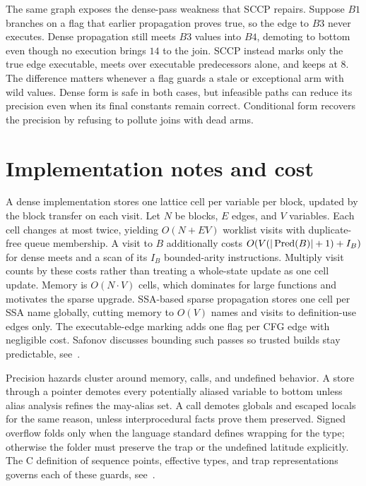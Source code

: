 The same graph exposes the dense-pass weakness that SCCP repairs.
Suppose $B1$ branches on a flag that earlier propagation proves true, so the edge to $B3$ never executes.
Dense propagation still meets $B3$ values into $B4$, demoting  to bottom even though no execution brings $14$ to the join.
SCCP instead marks only the true edge executable, meets over executable predecessors alone, and keeps  at $8$.
The difference matters whenever a flag guards a stale or exceptional arm with wild values.
Dense form is safe in both cases, but infeasible paths can reduce its precision even when its final constants remain correct.
Conditional form recovers the precision by refusing to pollute joins with dead arms.

\section{Implementation notes and cost}
\label{sec:ch14-implementation}

A dense implementation stores one lattice cell per variable per block, updated by the block transfer on each visit.
Let $N$ be blocks, $E$ edges, and $V$ variables.
Each cell changes at most twice, yielding $O(N+EV)$ worklist visits with duplicate-free queue membership.
A visit to $B$ additionally costs $O(V(|\operatorname{Pred}(B)|+1)+I_B)$ for dense meets and a scan of its $I_B$ bounded-arity instructions.
Multiply visit counts by these costs rather than treating a whole-state update as one cell update.
Memory is $O(N \cdot V)$ cells, which dominates for large functions and motivates the sparse upgrade.
SSA-based sparse propagation stores one cell per SSA name globally, cutting memory to $O(V)$ names and visits to definition-use edges only.
The executable-edge marking adds one flag per CFG edge with negligible cost.
Safonov discusses bounding such passes so trusted builds stay predictable, see~\cite{safonov-2010-trustworthy}.

Precision hazards cluster around memory, calls, and undefined behavior.
A store through a pointer demotes every potentially aliased variable to bottom unless alias analysis refines the may-alias set.
A call demotes globals and escaped locals for the same reason, unless interprocedural facts prove them preserved.
Signed overflow folds only when the language standard defines wrapping for the type; otherwise the folder must preserve the trap or the undefined latitude explicitly.
The C definition of sequence points, effective types, and trap representations governs each of these guards, see~\cite{wg14-2011-c11}.

